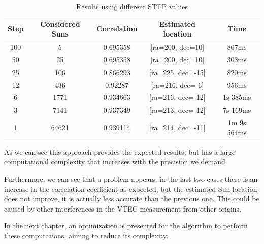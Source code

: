 \begin{table}[h!]
	\centering
	\def\arraystretch{1.2}
	\begin{tabular}{|c c c c c|} 
		\hline
		Step & Considered Suns & Correlation & Estimated location & Time \\ [0.5ex] 
		\hline\hline
		100 & 5 & 0.695358 & [ra=200, dec=10] & 867ms \\
		\hline 
		50 & 25 & 0.695358 & [ra=200, dec=10] & 303ms \\
			\hline 
		25 & 106 & 0.866293 & [ra=225, dec=-15] & 820ms \\
			\hline 
		12 & 436 & 0.92287 & [ra=216, dec=-6] & 956ms \\
			\hline 
		6 & 1771 & 0.934663 & [ra=216, dec=-12] & 1s 385ms \\
			\hline 
		3 & 7141 & 0.937349 & [ra=213, dec=-12] & 7s 169ms \\
			\hline 
		1 & 64621 & 0.939114 & [ra=214, dec=-11] & 1m 9s 564ms \\
		\hline 
	\end{tabular}
	\caption{Results using different STEP values}
\end{table}

As we can see this approach provides the expected results, but has a large computational complexity that increases with the precision we demand. 

Furthermore, we can see that a problem appears: in the last two cases there is an increase in the correlation coefficient as expected, but the estimated Sun location does not improve, it is actually less accurate than the previous one. This could be caused by other interferences in the VTEC measurement from other origins.

In the next chapter, an optimization is presented for the algorithm to perform these computations, aiming to reduce its complexity.
